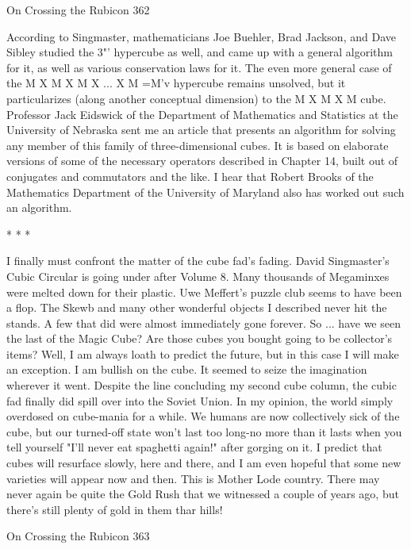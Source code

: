 On Crossing the Rubicon                                                               362

        According to Singmaster, mathematicians Joe Buehler, Brad Jackson, and
Dave Sibley studied the 3"' hypercube as well, and came up with a general
algorithm for it, as well as various conservation laws for it. The even more general
case of the M X M X M X ... X M =M'v hypercube remains unsolved, but it
particularizes (along another conceptual dimension) to the M X M X M cube.
Professor Jack Eidswick of the Department of Mathematics and Statistics at the
University of Nebraska sent me an article that presents an algorithm for solving
any member of this family of three-dimensional cubes. It is based on elaborate
versions of some of the necessary operators described in Chapter 14, built out of
conjugates and commutators and the like. I hear that Robert Brooks of the
Mathematics Department of the University of Maryland also has worked out such
an algorithm.

                                      *       *      *

        I finally must confront the matter of the cube fad's fading. David
Singmaster's Cubic Circular is going under after Volume 8. Many thousands of
Megaminxes were melted down for their plastic. Uwe Meffert's puzzle club seems
to have been a flop. The Skewb and many other wonderful objects I described
never hit the stands. A few that did were almost immediately gone forever. So ...
have we seen the last of the Magic Cube? Are those cubes you bought going to be
collector's items? Well, I am always loath to predict the future, but in this case I
will make an exception. I am bullish on the cube. It seemed to seize the
imagination wherever it went. Despite the line concluding my second cube column,
the cubic fad finally did spill over into the Soviet Union.
        In my opinion, the world simply overdosed on cube-mania for a while. We
humans are now collectively sick of the cube, but our turned-off state won't last too
long-no more than it lasts when you tell yourself "I'll never eat spaghetti again!"
after gorging on it. I predict that cubes will resurface slowly, here and there, and I
am even hopeful that some new varieties will appear now and then. This is Mother
Lode country. There may never again be quite the Gold Rush that we witnessed a
couple of years ago, but there's still plenty of gold in them thar hills!




On Crossing the Rubicon                                                              363

